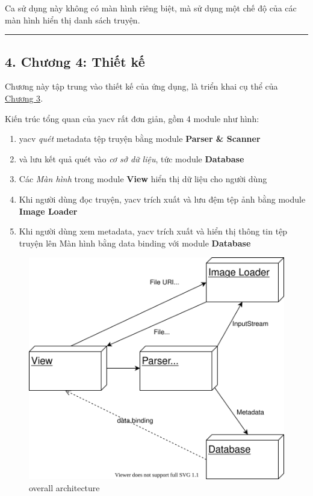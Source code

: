 \documentclass[
]{article}
\providecommand{\tightlist}{%
  \setlength{\itemsep}{0pt}\setlength{\parskip}{0pt}}
\begin{document}
Ca sử dụng này không có màn hình riêng biệt, mà sử dụng một chế độ của
các màn hình hiển thị danh sách truyện.

\begin{center}\rule{0.5\linewidth}{0.5pt}\end{center}

\hypertarget{chux1b0ux1a1ng-4-thiux1ebft-kux1ebf}{%
\subsection{\texorpdfstring{4. Chương 4: Thiết kế
}{4. Chương 4: Thiết kế }}\label{chux1b0ux1a1ng-4-thiux1ebft-kux1ebf}}

Chương này tập trung vào thiết kế của ứng dụng, là triển khai cụ thể của
\protect\hyperlink{P3-specification}{Chương 3}.

Kiến trúc tổng quan của yacv rất đơn giản, gồm 4 module như hình:

\begin{enumerate}
\def\labelenumi{\arabic{enumi}.}
\tightlist
\item
  yacv \emph{quét} metadata tệp truyện bằng module \textbf{Parser \&
  Scanner}
\item
  và lưu kết quả quét vào \emph{cơ sở dữ liệu}, tức module
  \textbf{Database}
\item
  Các \emph{Màn hình} trong module \textbf{View} hiển thị dữ liệu cho
  người dùng
\item
  Khi người dùng đọc truyện, yacv trích xuất và lưu đệm tệp ảnh bằng
  module \textbf{Image Loader}
\item
  Khi người dùng xem metadata, yacv trích xuất và hiển thị thông tin tệp
  truyện lên Màn hình bằng data binding với module \textbf{Database}
\end{enumerate}

\begin{figure}
\centering
\includegraphics{../images/overall_architecture.svg}
\caption{overall architecture}
\end{figure}
\end{document}
